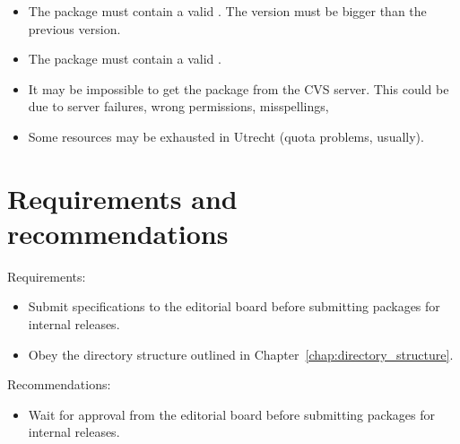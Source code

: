 {\begin{itemize}
\item The package must contain a valid .
      The version must be bigger than the previous version.

\item The package must contain a valid .

\item It may be impossible to get the package from the CVS server. 
      This could be due to server failures, wrong permissions, misspellings,
      \etc

\item Some resources may be exhausted in Utrecht (quota problems, usually).

\end{itemize}


\section{Requirements and recommendations}
\label{sec:submission_req_and_rec}

\noindent
Requirements:
\begin{itemize}
   \item Submit specifications to the editorial board before submitting
         packages for internal releases.
   \item Obey the directory structure outlined in Chapter~\ref{chap:directory_structure}.
\end{itemize}

\noindent
Recommendations:
\begin{itemize}
    \item Wait for approval from the editorial board before submitting packages
          for internal releases.
\end{itemize}
}


